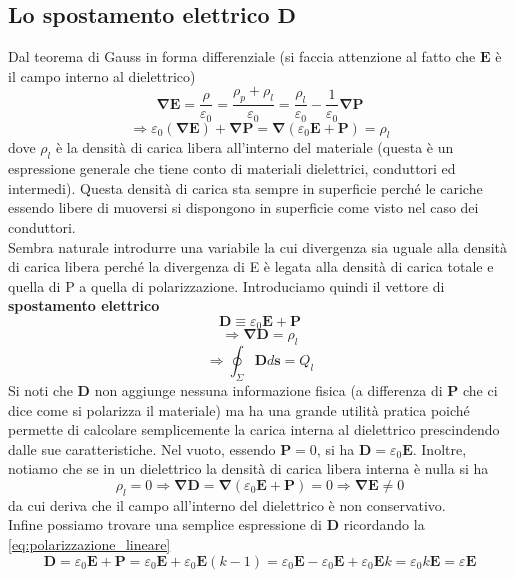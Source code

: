 \documentclass[10pt,a4paper]{article}
\begin{document}
\subsection{Lo spostamento elettrico $\mathbf{D}$}
Dal teorema di Gauss in forma differenziale (si faccia attenzione al fatto che $\mathbf{E}$ è il campo interno al dielettrico)
\[\mathbf{\nabla}\mathbf{E} = \frac{\rho}{\varepsilon_0} = \frac{\rho_p + \rho_l}{\varepsilon_0} = \frac{\rho_l}{\varepsilon_0}-\frac{1}{\varepsilon_0}\mathbf{\nabla}\mathbf{P}\]
\[\Rightarrow \varepsilon_0(\mathbf{\nabla}\mathbf{E})+\mathbf{\nabla}\mathbf{P} = \mathbf{\nabla}(\varepsilon_0\mathbf{E}+\mathbf{P})= \rho_l\]
dove $\rho_l$ è la densità di carica libera all'interno del materiale (questa è un espressione generale che tiene conto di materiali dielettrici, conduttori ed intermedi). Questa densità di carica sta sempre in superficie perché le cariche essendo libere di muoversi si dispongono in superficie come visto nel caso dei conduttori.\\
Sembra naturale introdurre una variabile la cui divergenza sia uguale alla densità di carica libera perché la divergenza di E è legata alla densità di carica totale e quella di P a quella di polarizzazione. Introduciamo quindi il vettore di \textbf{spostamento elettrico}
\[\mathbf{D} \equiv \varepsilon_0\mathbf{E}+\mathbf{P}\]
\[\Rightarrow \mathbf{\nabla}\mathbf{D} =\rho_l\]
\[\Rightarrow \oint_\Sigma\mathbf{D}d\mathbf{s} = Q_l\]
Si noti che $\mathbf{D}$ non aggiunge nessuna informazione fisica (a differenza di $\mathbf{P}$ che ci dice come si polarizza il materiale) ma ha una grande utilità pratica poiché permette di calcolare semplicemente la carica interna al dielettrico prescindendo dalle sue caratteristiche. Nel vuoto, essendo $\mathbf{P} = 0$, si ha $\mathbf{D} = \varepsilon_0\mathbf{E}$. Inoltre, notiamo che se in un dielettrico la densità di carica libera interna è nulla si ha
\[\rho_l = 0 \Rightarrow \mathbf{\nabla}\mathbf{D} =\mathbf{\nabla}(\varepsilon_0\mathbf{E}+\mathbf{P}) = 0 \Rightarrow \mathbf{\nabla}\mathbf{E}\neq 0\]
da cui deriva che il campo all'interno del dielettrico è non conservativo.\\
Infine possiamo trovare una semplice espressione di $\mathbf{D}$ ricordando la \ref{eq:polarizzazione_lineare}
\[\mathbf{D} = \varepsilon_0\mathbf{E}+\mathbf{P} = \varepsilon_0\mathbf{E}+ \varepsilon_0 \mathbf{E}(k-1)=  \varepsilon_0\mathbf{E}- \varepsilon_0 \mathbf{E}+\varepsilon_0 \mathbf{E}k=\varepsilon_0 k\mathbf{E} = \varepsilon \mathbf{E}\]
\end{document}
